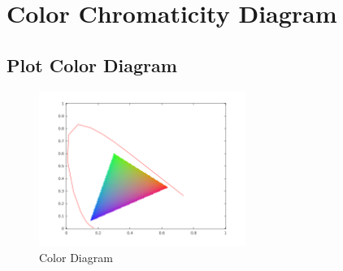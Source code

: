 \documentclass{article}
\begin{document}
\pagebreak
\section{Color Chromaticity Diagram}

\subsection{Plot Color Diagram}
	\begin{figure}[h]
		\begin{center}
			\includegraphics[width=0.6\textwidth]{color.png}
			\caption{Color Diagram}
		\end{center}
	\end{figure}
\end{document}
